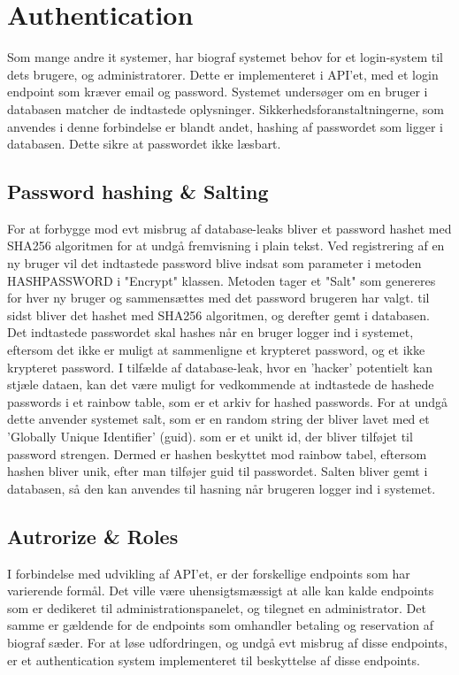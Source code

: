 ﻿\section{Authentication}\label{sec:auth}
Som mange andre it systemer, har biograf systemet behov for et login-system til dets brugere, og administratorer.
Dette er implementeret i API'et, med et login endpoint som kræver email og password. 
Systemet undersøger om en bruger i databasen matcher de indtastede oplysninger.
Sikkerhedsforanstaltningerne, som anvendes i denne forbindelse er blandt andet, 
hashing af passwordet som ligger i databasen. Dette sikre at passwordet ikke læsbart.\\

\subsection{Password hashing \& Salting}
For at forbygge mod evt misbrug af database-leaks bliver et password hashet med SHA256 algoritmen for at undgå fremvisning 
i plain tekst. Ved registrering af en ny bruger vil det indtastede 
password blive indsat som parameter i metoden HASHPASSWORD i "Encrypt" klassen. 
Metoden tager et "Salt" som genereres for hver ny bruger og sammensættes med det password brugeren har valgt. 
til sidst bliver det hashet med SHA256 algoritmen, og derefter gemt i databasen. 
Det indtastede passwordet skal hashes når en bruger logger ind i systemet, eftersom det ikke er muligt at sammenligne et krypteret password, og et ikke krypteret password.
I tilfælde af database-leak, hvor en 'hacker' potentielt kan stjæle dataen, kan det være muligt for vedkommende at indtastede
de hashede passwords i et rainbow table, som er et arkiv for hashed passwords.
For at undgå dette anvender systemet salt, som er en random string der bliver lavet med et 'Globally Unique Identifier' (guid).
som er et unikt id, der bliver tilføjet til password strengen. Dermed er hashen beskyttet mod rainbow tabel, eftersom hashen 
bliver unik, efter man tilføjer guid til passwordet. Salten bliver gemt i databasen, så den kan anvendes til hasning
når brugeren logger ind i systemet.\\

\subsection{Autrorize \& Roles}
I forbindelse med udvikling af API'et, er der forskellige endpoints som har varierende formål. Det ville være
uhensigtsmæssigt at alle kan kalde endpoints som er dedikeret til administrationspanelet, og tilegnet 
en administrator. Det samme er gældende for de endpoints som omhandler betaling og
reservation af biograf sæder. For at løse udfordringen, og undgå evt misbrug af disse 
endpoints, er et authentication system implementeret til beskyttelse af disse endpoints.


